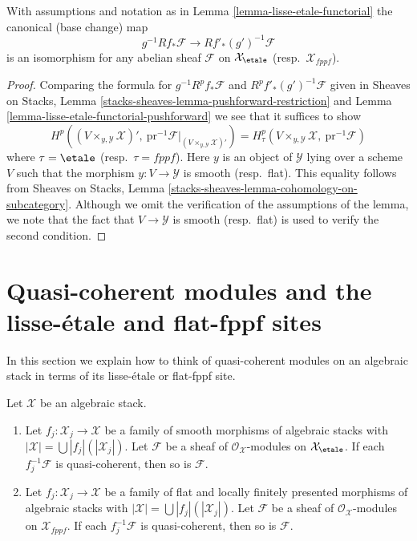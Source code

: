\begin{lemma}
\label{lemma-lisse-etale-functorial-cohomology}
With assumptions and notation as in Lemma \ref{lemma-lisse-etale-functorial}
the canonical (base change) map
$$
g^{-1}Rf_*\mathcal{F} \longrightarrow Rf'_*(g')^{-1}\mathcal{F}
$$
is an isomorphism for any abelian sheaf $\mathcal{F}$
on $\mathcal{X}_\etale$ (resp.\ $\mathcal{X}_{fppf}$).
\end{lemma}

\begin{proof}
Comparing the formula for $g^{-1}R^pf_*\mathcal{F}$
and $R^pf'_*(g')^{-1}\mathcal{F}$ given in
Sheaves on Stacks, Lemma \ref{stacks-sheaves-lemma-pushforward-restriction}
and Lemma \ref{lemma-lisse-etale-functorial-pushforward}
we see that it suffices to show
$$
H^p((V \times_{y, \mathcal{Y}} \mathcal{X})',
\ \text{pr}^{-1}\mathcal{F}|_{(V \times_{y, \mathcal{Y}} \mathcal{X})'})
=
H^p_\tau(V \times_{y, \mathcal{Y}} \mathcal{X},\ \text{pr}^{-1}\mathcal{F})
$$
where $\tau = \etale$ (resp.\ $\tau = fppf$). Here $y$ is an object
of $\mathcal{Y}$ lying over a scheme $V$ such that the morphism
$y : V \to \mathcal{Y}$ is smooth (resp.\ flat).
This equality follows from
Sheaves on Stacks, Lemma \ref{stacks-sheaves-lemma-cohomology-on-subcategory}.
Although we omit the verification of the assumptions
of the lemma, we note that the fact that $V \to \mathcal{Y}$ is smooth
(resp.\ flat) is used to verify the second condition.
\end{proof}






\section{Quasi-coherent modules and the lisse-\'etale and flat-fppf sites}
\label{section-quasi-coherent-modules-II}

\noindent
In this section we explain how to think of quasi-coherent modules
on an algebraic stack in terms of its lisse-\'etale or flat-fppf site.

\begin{lemma}
\label{lemma-check-qc-on-etale-covering}
Let $\mathcal{X}$ be an algebraic stack.
\begin{enumerate}
\item Let $f_j : \mathcal{X}_j \to \mathcal{X}$ be a family of smooth
morphisms of algebraic stacks with
$|\mathcal{X}| =\bigcup |f_j|(|\mathcal{X}_j|)$.
Let $\mathcal{F}$ be a sheaf of $\mathcal{O}_\mathcal{X}$-modules
on $\mathcal{X}_\etale$. If each $f_j^{-1}\mathcal{F}$
is quasi-coherent, then so is $\mathcal{F}$.
\item Let $f_j : \mathcal{X}_j \to \mathcal{X}$ be a family of flat and
locally finitely presented morphisms of algebraic stacks with
$|\mathcal{X}| =\bigcup |f_j|(|\mathcal{X}_j|)$.
Let $\mathcal{F}$ be a sheaf of $\mathcal{O}_\mathcal{X}$-modules
on $\mathcal{X}_{fppf}$. If each $f_j^{-1}\mathcal{F}$
is quasi-coherent, then so is $\mathcal{F}$.
\end{enumerate}
\end{lemma}

